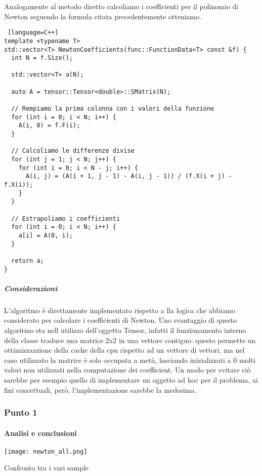 Analogamente al metodo diretto calcoliamo i coefficienti per il polinomio di
Newton seguendo la formula citata precedentemente otteniamo.

\begin{lstlisting} [language=C++]
template <typename T>
std::vector<T> NewtonCoefficients(func::FunctionData<T> const &f) {
  int N = f.Size();

  std::vector<T> a(N);

  auto A = tensor::Tensor<double>::SMatrix(N);

  // Rempiamo la prima colonna con i valori della funzione
  for (int i = 0; i < N; i++) {
    A(i, 0) = f.F(i);
  }

  // Calcoliamo le differenze divise
  for (int j = 1; j < N; j++) {
    for (int i = 0; i < N - j; i++) {
      A(i, j) = (A(i + 1, j - 1) - A(i, j - 1)) / (f.X(i + j) - f.X(i));
    }
  }

  // Estrapoliamo i coefficienti
  for (int i = 0; i < N; i++) {
    a[i] = A(0, i);
  }

  return a;
}
\end{lstlisting}

\subparagraph{Considerazioni} L'algoritmo è direttamente implementato rispetto a
lla logica che abbiamo considerato per calcolare i coefficienti di Newton.
Uno svantaggio di questo algoritmo sta nell utilizzo dell'oggetto Tensor, infatti
il funzionamento interno della classe traduce una matrice 2x2 in una vettore
contiguo: questo permette un ottimizzazzione della cache della cpu rispetto ad un
vettore di vettori, ma nel caso utilizzato la matrice è solo occupata a metà,
lasciando inizializzati a 0 molti valori non utilizzati nella computazione dei
coefficient.
Un modo per evitare ciò sarebbe per esempio quello di implementare un oggetto ad hoc
per il problema, ai fini concettuali, però, l'implementazione sarebbe la medesima.

\subsubsection{Punto 1}

\paragraph{Analisi e conclusioni}

\begin{marginfigure}
	\texttt{[image: newton\_all.png]}
	\caption{Confronto tra i vari sample}
	\label{fig:newton}
\end{marginfigure}

